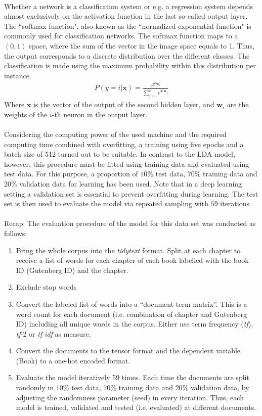 \documentclass[11pt,a4paper]{article}
\begin{document}
\ \\
Whether a network is a classification system or e.g. a regression system depends almost exclusively on the activation function in the last so-called output layer. The ``softmax function", also known as the ``normalized exponential function" \cite[p. 115]{Bishop2006} is commonly used for  classification networks. The softmax function maps to a $(0,1)$ space, where the sum of the vector in the image space equals to 1. Thus, the output corresponds to a discrete distribution over the different classes. The classification is made using the maximum probability within this distribution per instance.
\begin{align}
	P(y=i|\textbf{x})=\frac{e^{\textbf{x}^t\textbf{w}_i}}{\sum_{j=1}^ke^{\textbf{x}^t\textbf{w}_j}}
\end{align}
Where $\textbf{x}$ is the vector of the output of the second hidden layer, and $\textbf{w}_i$ are the weights of the $i$-th neuron in the output layer.\\
\ \\
Considering the computing power of the used machine and the required computing time combined with overfitting, a training using five epochs and a batch size of 512 turned out to be suitable. In contrast to the LDA model, however, this procedure must be fitted using training data and evaluated using test data. For this purpose, a proportion of $10\%$ test data, $70\%$ training data and $20\%$ validation data for learning has been used. Note that in a deep learning setting a validation set is essential to prevent overfitting during learning. The test set is then used to evaluate the model via repeated sampling with $59$ iterations.\\
\ \\
Recap: The evaluation procedure of the model for this data set was conducted as follows: 
\begin{enumerate}
	\item Bring the whole corpus into the \textit{tidytext} format. Split at each chapter to receive a list of words for each chapter of each book labelled with the book ID (Gutenberg ID) and the chapter.
	\item Exclude stop words
	\item Convert the labeled list of words into a “document term matrix”. This is a word count for each document (i.e. combination of chapter and Gutenberg ID) including all unique words in the corpus. Either use term frequency (\textit{tf}), \textit{tf}-2 or \textit{tf-idf} as measure.
	\item Convert the documents to the tensor format and the dependent variable (Book) to a one-hot encoded format.
	\item Evaluate the model iteratively 59 times. Each time the documents are split randomly in $10\%$ test data, $70\%$ training data and $20\%$ validation data, by adjusting the randomness parameter (seed) in every iteration. Thus, each model is trained, validated and tested (i.e. evaluated) at different documents.
\end{enumerate} 
\end{document}
